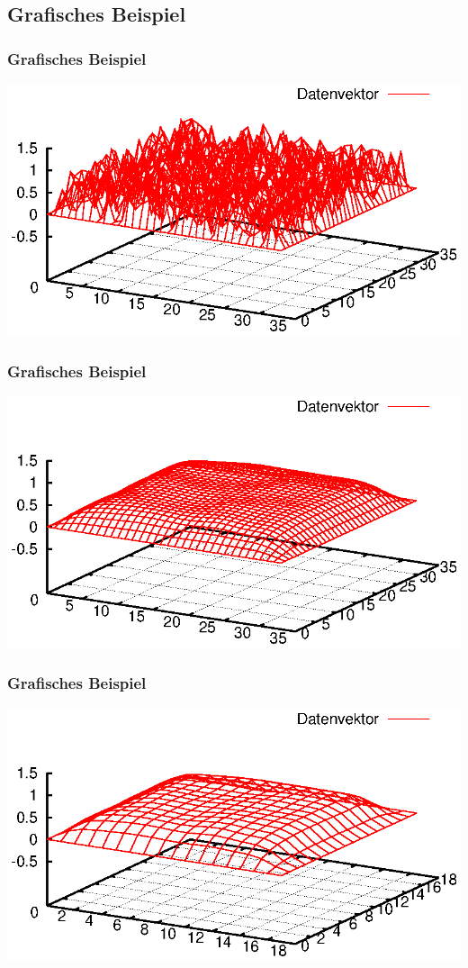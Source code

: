 \documentclass{beamer}
\begin{document}
\subsection{Grafisches Beispiel}
\begin{frame}\frametitle{Grafisches Beispiel}\includegraphics[trim=25 0 25 0, clip, width=\textwidth]{plots/000}\end{frame}
\begin{frame}\frametitle{Grafisches Beispiel}\includegraphics[trim=25 0 25 0, clip, width=\textwidth]{plots/001}\end{frame}
\begin{frame}\frametitle{Grafisches Beispiel}\includegraphics[trim=25 0 25 0, clip, width=\textwidth]{plots/002}\end{frame}
\end{document}
